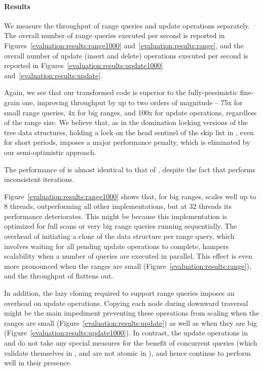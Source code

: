 \paragraph{Results}
We measure the throughput of range queries and update operations separately.
The overall number of range queries executed per second is reported
in Figures~\ref{evaluation:results:range1000}
and~\ref{evaluation:results:range}, and the overall number of update (insert
and delete) operations executed per second is reported in
Figures~\ref{evaluation:results:update1000} and~\ref{evaluation:results:update}.

Again, we see that our transformed code
 is superior to the fully-pessimistic fine-grain one, improving throughput by
up to two orders of magnitude -- 75x for small range queries, 4x for big
ranges, and 100x for update operations, regardless of the range size. We believe that,
as in the
domination locking versions of the tree data structures, holding a lock on the head sentinel of the skip list in
\domSkiplist, even for short periods, imposes a major performance penalty,
which is eliminated by our  semi-optimistic approach.

The performance of \autoSkiplist is almost
identical to that of \skiplist, despite the fact that \skiplist performs inconsistent iterations.

Figure~\ref{evaluation:results:range1000}
shows that, for big ranges, \bronson scales well up to $8$ threads, outperforming
all other implementations, but at $32$ threads its performance deteriorates.
This might be because this implementation is
optimized for full scans or very big range queries running sequentially.
The overhead of initiating a clone of the data structure per range query, which
involves waiting for all
pending update operations to complete, hampers scalability when
a number of queries are executed in parallel. This effect is even more pronounced when the
ranges are small (Figure~\ref{evaluation:results:range}), and the throughput of
\bronson flattens out.

In addition, the lazy cloning required to support
range queries imposes an overhead on  update operations. Copying each node
during downward traversal might be the main impediment preventing these
operations from scaling when the ranges are small (Figure~\ref{evaluation:results:update}) as well as when
they are big (Figure~\ref{evaluation:results:update1000}). In contrast,
the update operations in \autoSkiplist and \skiplist do not take any special
measures for the benefit of concurrent queries (which validate themselves in
\autoSkiplist, and are not atomic in \skiplist), and hence continue to perform well in
their presence.
